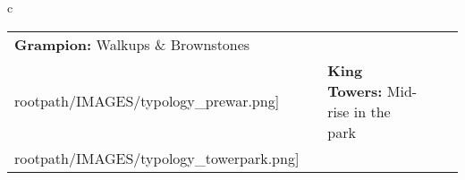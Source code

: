\begin{table}[H]
        \begin{tabular}{c}
        \begin{tabular}{m{1.25in} m{2in} m{.1in} m{1.25in} m{2in}}
\textbf{Grampion:} {Walkups \& Brownstones} & \texttt{[image: \\rootpath/IMAGES/typology\_prewar.png]} & & \textbf{King Towers:} {Mid-rise in the park} & \texttt{[image: \\rootpath/IMAGES/typology\_towerpark.png]}
\end{tabular}\end{tabular}
        \end{table}